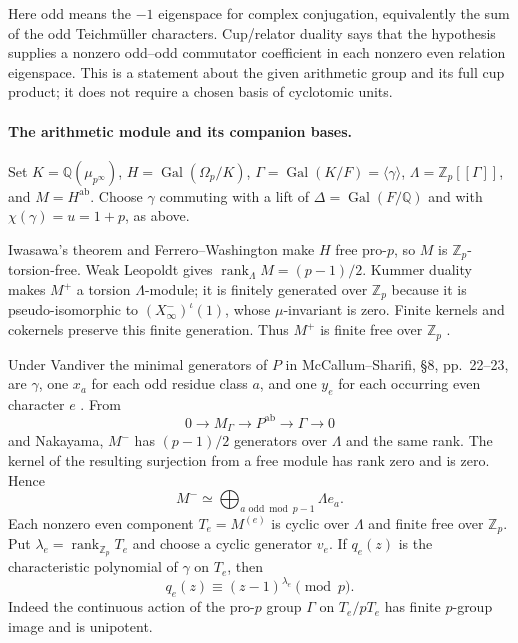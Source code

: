 \documentclass[11pt,a4paper]{article}
\theoremstyle{definition}
\begin{document}
Here odd means the $-1$ eigenspace for complex conjugation, equivalently the sum of the odd Teichm\"uller characters. Cup/relator duality says that the hypothesis supplies a nonzero odd--odd commutator coefficient in each nonzero even relation eigenspace. This is a statement about the given arithmetic group and its full cup product; it does not require a chosen basis of cyclotomic units.

\paragraph{The arithmetic module and its companion bases.}
Set $K=\mathbb Q(\mu_{p^\infty})$, $H=\operatorname{Gal}(\Omega_p/K)$, $\Gamma=\operatorname{Gal}(K/F)=\langle\gamma\rangle$, $\Lambda=\mathbb Z_p[[\Gamma]]$, and $M=H^{\mathrm{ab}}$. Choose $\gamma$ commuting with a lift of $\Delta=\operatorname{Gal}(F/\mathbb Q)$ and with $\chi(\gamma)=u=1+p$, as above.

Iwasawa's theorem and Ferrero--Washington make $H$ free pro-$p$, so $M$ is $\mathbb Z_p$-torsion-free. Weak Leopoldt gives $\operatorname{rank}_{\Lambda}M=(p-1)/2$. Kummer duality makes $M^+$ a torsion $\Lambda$-module; it is finitely generated over $\mathbb Z_p$ because it is pseudo-isomorphic to $(X_\infty^-)^\iota(1)$, whose $\mu$-invariant is zero. Finite kernels and cokernels preserve this finite generation. Thus $M^+$ is finite free over $\mathbb Z_p$ \cite[Theorem~2]{Iwasawa1981}\cite[Theorems~3.3.3--3.3.4, Proposition~3.4.7, Corollary~3.4.8]{SharifiIwasawaNotes}.

Under Vandiver the minimal generators of $P$ in McCallum--Sharifi, \S8, pp.~22--23, are $\gamma$, one $x_a$ for each odd residue class $a$, and one $y_e$ for each occurring even character $e$ \cite{McCallumSharifi2003}. From
\[
 0\longrightarrow M_\Gamma\longrightarrow P^{\mathrm{ab}}
  \longrightarrow\Gamma\longrightarrow0
\]
and Nakayama, $M^-$ has $(p-1)/2$ generators over $\Lambda$ and the same rank. The kernel of the resulting surjection from a free module has rank zero and is zero. Hence
\[
 M^-\simeq\bigoplus_{a\text{ odd}\bmod p-1}\Lambda e_a.       \tag{G.1}
\]
Each nonzero even component $T_e=M^{(e)}$ is cyclic over $\Lambda$ and finite free over $\mathbb Z_p$. Put $\lambda_e=\operatorname{rank}_{\mathbb Z_p}T_e$ and choose a cyclic generator $v_e$. If $q_e(z)$ is the characteristic polynomial of $\gamma$ on $T_e$, then
\[
 q_e(z)\equiv(z-1)^{\lambda_e}\pmod p.                         \tag{G.2}
\]
Indeed the continuous action of the pro-$p$ group $\Gamma$ on $T_e/pT_e$ has finite $p$-group image and is unipotent.
\end{document}
